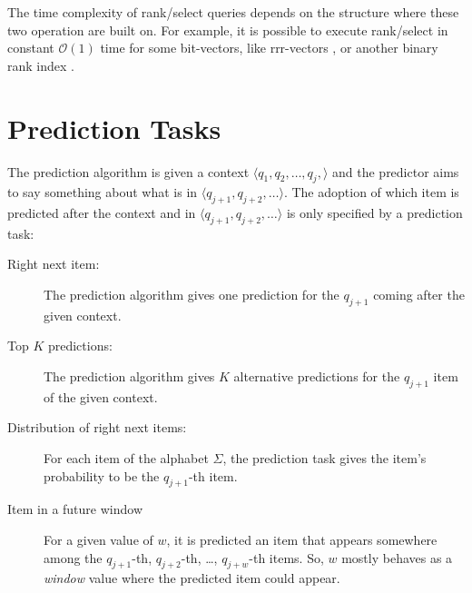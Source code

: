 The time complexity of rank/select queries depends on the structure where these two operation are built on. For example, it is possible to execute rank/select in constant \(\mathcal{O}(1)\) time for some bit-vectors, like rrr-vectors \cite{Raman}, or another binary rank index \cite{dillabaugh_2007}.

\section{Prediction Tasks} \label{App:predtask}
The prediction algorithm is given a context \(\langle q_1, q_2,\ldots, q_j,\rangle\) and the predictor aims to say something about what is in \(\langle q_{j+1},q_{j+2},\ldots\rangle\). The adoption of which item is predicted after the context and in \(\langle q_{j+1},q_{j+2},\ldots\rangle\) is only specified by a prediction task:
\begin{description}
  \item[Right next item:] The prediction algorithm gives one prediction for the \(q_{j+1}\) coming after the given context.
  \item[Top $K$ predictions:]  The prediction algorithm gives $K$ alternative predictions for the \(q_{j+1}\) item of the given context.
  \item[Distribution of right next items:]  For each item of the alphabet \(\Sigma\), the prediction task gives the item's probability to be the \(q_{j+1}\)-th item.
  \item[Item in a future window]  For a given value of \(w\), it is predicted an item that appears somewhere among the \(q_{j+1}\)-th, \(q_{j+2}\)-th, \ldots, \(q_{j+w}\)-th items. So, \(w\) mostly behaves as a \emph{window} value where the predicted item could appear. 
\end{description}